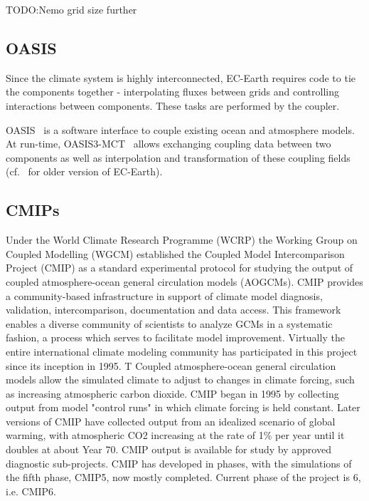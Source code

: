 TODO:Nemo grid size further

\subsection{OASIS}
Since the climate system is highly interconnected, EC-Earth requires code to tie the components together - interpolating fluxes between grids and controlling interactions between components. These tasks are performed by the coupler.

OASIS~\cite{gmd-6-373-2013} is a software interface to couple existing ocean and atmosphere models. At run-time, OASIS3-MCT~\cite{oasis3-mct} allows exchanging coupling data between two components as well as interpolation and transformation of these coupling fields 
(cf.~\cite{TM673} for older version of EC-Earth).


% 
%  



\subsection{CMIPs}
Under the World Climate Research Programme (WCRP) the Working Group on Coupled Modelling (WGCM) established the Coupled Model Intercomparison Project (CMIP) as a standard experimental protocol for studying the output of coupled atmosphere-ocean general circulation models (AOGCMs). CMIP provides a community-based infrastructure in support of climate model diagnosis, validation, intercomparison, documentation and data access. This framework enables a diverse community of scientists to analyze GCMs in a systematic fashion, a process which serves to facilitate model improvement. Virtually the entire international climate modeling community has participated in this project since its inception in 1995. T
Coupled atmosphere-ocean general circulation models allow the simulated climate to adjust to changes in climate forcing, such as increasing atmospheric carbon dioxide. CMIP began in 1995 by collecting output from model "control runs" in which climate forcing is held constant. Later versions of CMIP have collected output from an idealized scenario of global warming, with atmospheric CO2 increasing at the rate of 1\% per year until it doubles at about Year 70. CMIP output is available for study by approved diagnostic sub-projects. 
CMIP has developed in phases, with the simulations of the fifth phase, CMIP5, now mostly completed. Current phase of the project is 6, i.e. CMIP6. 

